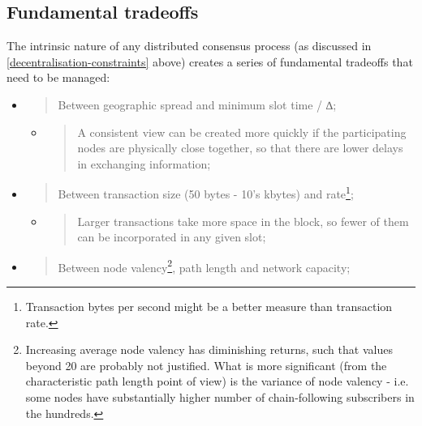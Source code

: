 \documentclass[11pt,a4paper]{article}
\begin{document}
\subsection{Fundamental tradeoffs}
\label{fundamental-tradeoffs}

The intrinsic nature of any distributed consensus process (as discussed
in \cref{decentralisation-constraints} above)
creates a series of fundamental tradeoffs that need to be managed:

\begin{itemize}
\item
  \begin{quote}
  Between geographic spread and minimum slot time / ∆;
  \end{quote}

  \begin{itemize}
  \item
    \begin{quote}
    A consistent view can be created more quickly if the participating
    nodes are physically close together, so that there are lower delays
    in exchanging information;
    \end{quote}
  \end{itemize}
\item
  \begin{quote}
  Between transaction size (50 bytes - 10's kbytes) and rate\footnote{Transaction
    bytes per second might be a better measure than transaction rate.};
  \end{quote}

  \begin{itemize}
  \item
    \begin{quote}
    Larger transactions take more space in the block, so fewer of them
    can be incorporated in any given slot;
    \end{quote}
  \end{itemize}
\item
  \begin{quote}
  Between node valency\footnote{Increasing average node valency has
    diminishing returns, such that values beyond 20 are probably not
    justified. What is more significant (from the characteristic path
    length point of view) is the variance of node valency - i.e. some
    nodes have substantially higher number of chain-following
    subscribers in the hundreds.}, path length and network capacity;
  \end{quote}


\end{itemize}
\end{document}
